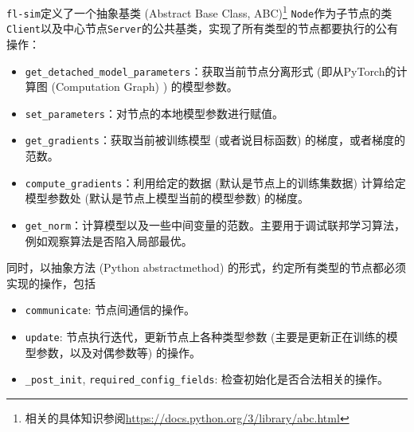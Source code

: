 \texttt{fl-sim}定义了一个抽象基类 (Abstract Base Class, ABC)\footnote{相关的具体知识参阅\url{https://docs.python.org/3/library/abc.html}} \texttt{Node}作为子节点的类\texttt{Client}以及中心节点\texttt{Server}的公共基类，实现了所有类型的节点都要执行的公有操作：
\begin{itemize}
    \item \texttt{get\_detached\_model\_parameters}：获取当前节点分离形式 (即从PyTorch的计算图 (Computation Graph) ) 的模型参数。
    \item \texttt{set\_parameters}：对节点的本地模型参数进行赋值。
    \item \texttt{get\_gradients}：获取当前被训练模型 (或者说目标函数) 的梯度，或者梯度的范数。
    \item \texttt{compute\_gradients}：利用给定的数据 (默认是节点上的训练集数据) 计算给定模型参数处 (默认是节点上模型当前的模型参数) 的梯度。
    \item \texttt{get\_norm}：计算模型以及一些中间变量的范数。主要用于调试联邦学习算法，例如观察算法是否陷入局部最优。
\end{itemize}
同时，以抽象方法 (Python abstractmethod) 的形式，约定所有类型的节点都必须实现的操作，包括
\begin{itemize}
    \item \texttt{communicate}: 节点间通信的操作。
    \item \texttt{update}: 节点执行迭代，更新节点上各种类型参数 (主要是更新正在训练的模型参数，以及对偶参数等) 的操作。
    \item \texttt{\_post\_init}, \texttt{required\_config\_fields}: 检查初始化是否合法相关的操作。
\end{itemize}

